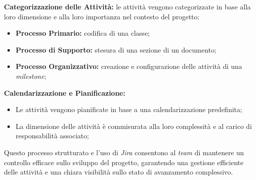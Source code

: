 \documentclass[5pt]{article}
\begin{document}
\textbf{Categorizzazione delle Attività:} le attività vengono categorizzate in base alla loro dimensione e alla loro importanza nel contesto del progetto:
\begin{itemize}
    \item \textbf{Processo Primario:} codifica di una classe;
    \item \textbf{Processo di Supporto:} stesura di una sezione di un documento;
    \item \textbf{Processo Organizzativo:} creazione e configurazione delle attività di una \textit{milestone};
\end{itemize}

\textbf{Calendarizzazione e Pianificazione:}
\begin{itemize}
    \item Le attività vengono pianificate in base a una calendarizzazione predefinita;
    \item La dimensione delle attività è commisurata alla loro complessità e al carico di responsabilità associato;
\end{itemize}
Questo processo strutturato e l'uso di \textit{Jira} consentono al \textit{team} di mantenere un controllo efficace sullo sviluppo del progetto, garantendo una gestione efficiente delle attività e una chiara visibilità sullo stato di avanzamento complessivo.
\end{document}
